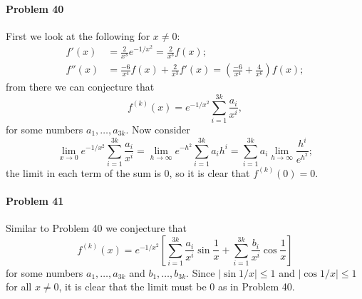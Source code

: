 \documentclass{article}
\begin{document}
\paragraph{Problem 40} First we look at the following for $x \neq 0$:
\begin{align*}
  f'(x) &= \frac{2}{x^3}e^{-1/x^2} = \frac{2}{x^3}f(x); \\
  f''(x) &= \frac{-6}{x^4}f(x) + \frac{2}{x^3}f'(x)
  = \left(\frac{-6}{x^4} + \frac{4}{x^6}\right)f(x);
\end{align*}
from there we can conjecture that \[
  f^{(k)}(x) = e^{-1/x^2}\sum_{i=1}^{3k}\frac{a_i}{x^i},
\] for some numbers $a_1, \ldots, a_{3k}$. Now consider \[
  \lim_{x \to 0}e^{-1/x^2}\sum_{i=1}^{3k}\frac{a_i}{x^i}
  = \lim_{h \to \infty}e^{-h^2}\sum_{i=1}^{3k}a_ih^i
  = \sum_{i=1}^{3k}a_i\lim_{h \to \infty}\frac{h^i}{e^{h^2}};
\] the limit in each term of the sum is 0, so it is clear that $f^{(k)}(0) =
0$.

\paragraph{Problem 41} Similar to Problem 40 we conjecture that \[
  f^{(k)}(x) = e^{-1/x^2}\left[
    \sum_{i=1}^{3k}\frac{a_i}{x^i}\sin\frac{1}{x}
    + \sum_{i=1}^{3k}\frac{b_i}{x^i}\cos\frac{1}{x}
  \right]
\] for some numbers $a_1, \ldots, a_{3k}$ and $b_1, \ldots, b_{3k}$. Since
$|\sin 1/x| \leq 1$ and $|\cos 1/x| \leq 1$ for all $x \neq 0$, it is clear
that the limit must be 0 as in Problem 40.
\end{document}
